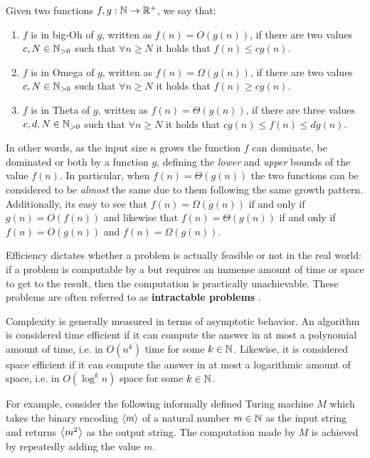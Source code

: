 \begin{definition}
 Given two functions $f, g : \mathbb{N} \to \mathbb{R}^+$, we say that:
    \begin{enumerate}
        \item $f$ is in big-Oh of $g$, written as $f(n) = O(g(n))$, if there are two values $c, N \in \mathbb{N}_{> 0}$ such that $\forall n \geq N$ it holds that $f(n) \leq c g(n)$.
        \item $f$ is in Omega of $g$, written as $f(n) = \Omega(g(n))$, if there are two values $c, N \in \mathbb{N}_{> 0}$ such that $\forall n \geq N$ it holds that $f(n) \geq c g(n)$.
        \item $f$ is in Theta of $g$, written as $f(n) = \Theta(g(n))$, if there are three values $c,d, N \in \mathbb{N}_{> 0}$ such that $\forall n \geq N$ it holds that $c g(n) \leq f(n) \leq d g(n)$.
    \end{enumerate}
\end{definition}

\newpage

In other words, as the input size $n$ grows the function $f$ can dominate, be dominated or both by a function $g$, defining the \textit{lower} and \textit{upper} bounds of the value $f(n)$. In particular, when $f(n) = \Theta(g(n))$ the two functions can be considered to be \textit{almost} the same due to them following the same growth pattern. Additionally, its easy to see that $f(n) = \Omega(g(n))$ if and only if $g(n) = O(f(n))$ and likewise that $f(n) = \Theta(g(n))$ if and only if $f(n) = O(g(n))$ and $f(n) = \Omega(g(n))$. 

Efficiency dictates whether a problem is actually feasible or not in the real world: if a problem is computable by a \TM but requires an immense amount of time or space to get to the result, then the computation is practically unachievable. These problems are often referred to as \textbf{intractable problems} \cite{complexity_arora_barak,sipser_computation}.

Complexity is generally measured in terms of asymptotic behavior. An algorithm is considered time efficient if it can compute the answer in at most a polynomial amount of time, i.e. in $O(n^k)$ time for some $k \in \mathbb{N}$. Likewise, it is considered space efficient if it can compute the answer in at most a logarithmic amount of space, i.e. in $O(\log^k n)$ space for some $k \in \mathbb{N}$.

For example, consider the following informally defined Turing machine $M$ which takes the binary encoding $\left\langle m\right\rangle$ of a natural number $m \in \mathbb{N}$ as the input string and returns $\left\langle m^2\right\rangle$ as the output string. The computation made by $M$ is achieved by repeatedly adding the value $m$.

